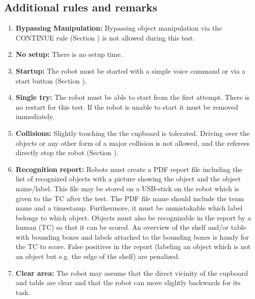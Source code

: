 \subsection{Additional rules and remarks}
\begin{enumerate}
\item \textbf{Bypassing Manipulation:} Bypassing object manipulation via the CONTINUE rule (Section ) is not allowed during this test.
\item \textbf{No setup:} There is no setup time.
\item \textbf{Startup:} The robot must be started with a simple voice command or via a start button (Section ). 
\item \textbf{Single try:} The robot must be able to start from the first attempt. There is no restart for this test. If the robot is unable to start it must be removed immediately.
\item \textbf{Collisions:} Slightly touching the the cupboard is tolerated.
  Driving over the objects or any other form of a major collision is not allowed, and the referees directly stop the robot (Section ).
\item \textbf{Recognition report:} Robots must create a PDF report file including the list of recognized objects with a picture showing the object and the object name/label.
  This file may be stored on a USB-stick on the robot which is given to the TC after the test. The PDF file name should include the team name and a timestamp. 
  Furthermore, it must be unmistakable which label belongs to which object. Objects must also be recognizable in the report by a human (TC) so that it can be scored. 
  An overview of the shelf and/or table with bounding boxes and labels attached to the bounding boxes is handy for the TC to score.
  False positives in the report (labeling an object which is not an object but e.g. the edge of the shelf) are penalized.
  \item \textbf{Clear area: } The robot may assume that the direct vicinity of the cupboard and table are clear and that the robot can move slightly backwards for its task.

\end{enumerate}
